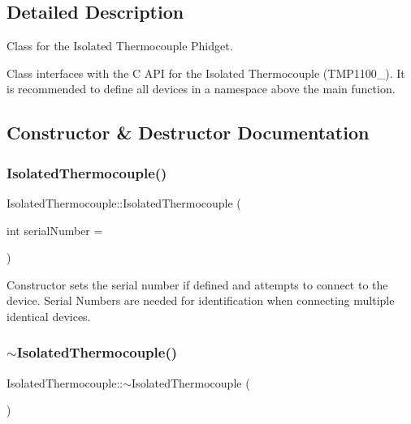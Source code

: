 \subsection{Detailed Description}
Class for the Isolated Thermocouple Phidget. 

Class interfaces with the C A\+PI for the Isolated Thermocouple (T\+M\+P1100\+\_). It is recommended to define all devices in a namespace above the main function. 

\subsection{Constructor \& Destructor Documentation}
\mbox{\label{classIsolatedThermocouple_aa47500e6b64c5022119f5842fec998ab}} 
\subsubsection{\texorpdfstring{Isolated\+Thermocouple()}{IsolatedThermocouple()}}
{\footnotesize\ttfamily Isolated\+Thermocouple\+::\+Isolated\+Thermocouple (\begin{DoxyParamCaption}\item[{int}]{serial\+Number = {} }\end{DoxyParamCaption})\hspace{0.3cm}{\ttfamily [inline]}}

Constructor sets the serial number if defined and attempts to connect to the device. Serial Numbers are needed for identification when connecting multiple identical devices.\mbox{\label{classIsolatedThermocouple_aec83a3f556a27500ab340a87d27dbe4d}} 
\subsubsection{\texorpdfstring{$\sim$\+Isolated\+Thermocouple()}{~IsolatedThermocouple()}}
{\footnotesize\ttfamily Isolated\+Thermocouple\+::$\sim$\+Isolated\+Thermocouple (\begin{DoxyParamCaption}{ }\end{DoxyParamCaption})\hspace{0.3cm}{\ttfamily [inline]}}

